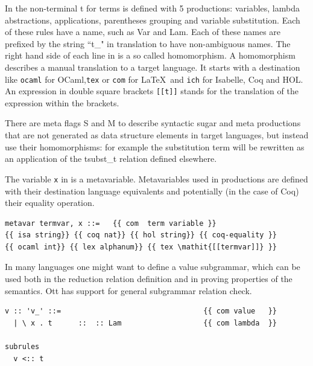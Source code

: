 \documentclass[12pt,twoside,notitlepage]{report}
\theoremstyle{plain}%
\theoremstyle{definition}
\theoremstyle{remark}
\begin{document}
In  the non-terminal t for terms is defined with 5 productions: variables, lambda abstractions, applications, parentheses grouping and variable substitution. Each of these rules have a name, such as Var and Lam. Each of these names are prefixed by the string ``t\_" in translation to have non-ambiguous names. The right hand side of each line in  is a so called homomorphism. A homomorphism describes a manual translation to a target language.  \label{sec:ott_homo} It starts with a destination like \lstinline[language={Ott}]|ocaml| for OCaml,\lstinline[language={Ott}]|tex| or \lstinline[language={Ott}]|com| for \LaTeX\, and \lstinline[language={Ott}]|ich| for Isabelle, Coq and HOL. An expression in double square brackets \lstinline[language={Ott}]|[[t]]| stands for the translation of the expression within the brackets. 

There are meta flags S and M to describe syntactic sugar and meta productions that are not generated as data structure elements in target languages, but instead use their homomorphisms: for example the substitution term will be rewritten as an application of the tsubst\_t relation defined elsewhere. 

The variable \lstinline[language={Ott}]|x| in  is a metavariable. Metavariables used in productions are defined with their destination language equivalents and potentially (in the case of Coq) their equality operation.

\begin{lstlisting}[language={Ott}, caption={Ott metavariable definition}]
metavar termvar, x ::=   {{ com  term variable }} 
{{ isa string}} {{ coq nat}} {{ hol string}} {{ coq-equality }}
{{ ocaml int}} {{ lex alphanum}} {{ tex \mathit{[[termvar]]} }}
\end{lstlisting}

In many languages one might want to define a value subgrammar, which can be used both in the reduction relation definition and in proving properties of the semantics. Ott has support for general subgrammar relation check.

\begin{lstlisting}[language={Ott}, caption={Ott value subgrammar example}, label={lst:ottvaluesubgrammarexample}]
v :: 'v_' ::=                                 {{ com value   }}
  | \ x . t      ::  :: Lam                   {{ com lambda  }}
  
subrules
  v <:: t
\end{lstlisting}
\end{document}
